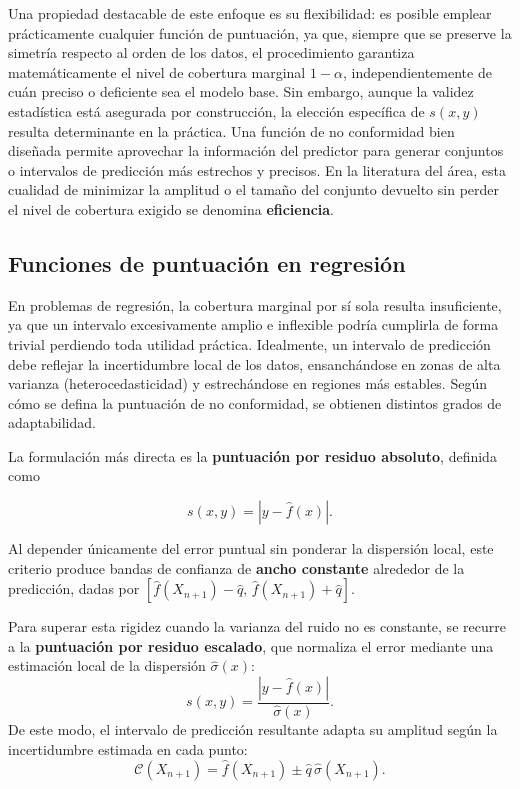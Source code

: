 Una propiedad destacable de este enfoque es su flexibilidad: es posible emplear prácticamente cualquier función de puntuación, ya que, siempre que se preserve la simetría respecto al orden de los datos, el procedimiento garantiza matemáticamente el nivel de cobertura marginal $1-\alpha$, independientemente de cuán preciso o deficiente sea el modelo base. Sin embargo, aunque la validez estadística está asegurada por construcción, la elección específica de $s(x, y)$ resulta determinante en la práctica. Una función de no conformidad bien diseñada permite aprovechar la información del predictor para generar conjuntos o intervalos de predicción más estrechos y precisos. En la literatura del área, esta cualidad de minimizar la amplitud o el tamaño del conjunto devuelto sin perder el nivel de cobertura exigido se denomina \textbf{eficiencia}.

\subsection{Funciones de puntuación en regresión}

En problemas de regresión, la cobertura marginal por sí sola resulta insuficiente, ya que un intervalo excesivamente amplio e inflexible podría cumplirla de forma trivial perdiendo toda utilidad práctica. Idealmente, un intervalo de predicción debe reflejar la incertidumbre local de los datos, ensanchándose en zonas de alta varianza (heterocedasticidad) y estrechándose en regiones más estables. Según cómo se defina la puntuación de no conformidad, se obtienen distintos grados de adaptabilidad.

La formulación más directa es la \textbf{puntuación por residuo absoluto}, definida como 

\begin{equation}
    s(x, y) = |y - \hat{f}(x)|.
\end{equation}

Al depender únicamente del error puntual sin ponderar la dispersión local, este criterio produce bandas de confianza de \textbf{ancho constante} alrededor de la predicción, dadas por $[\hat{f}(X_{n+1}) - \hat{q}, \, \hat{f}(X_{n+1}) + \hat{q}]$.

Para superar esta rigidez cuando la varianza del ruido no es constante, se recurre a la \textbf{puntuación por residuo escalado}, que normaliza el error mediante una estimación local de la dispersión $\hat{\sigma}(x)$:
\begin{equation}
    s(x, y) = \frac{|y - \hat{f}(x)|}{\hat{\sigma}(x)}.
\end{equation}
De este modo, el intervalo de predicción resultante adapta su amplitud según la incertidumbre estimada en cada punto:
\begin{equation}
    \mathcal{C}(X_{n+1}) = \hat{f}(X_{n+1}) \pm \hat{q}\,\hat{\sigma}(X_{n+1}).
\end{equation}

